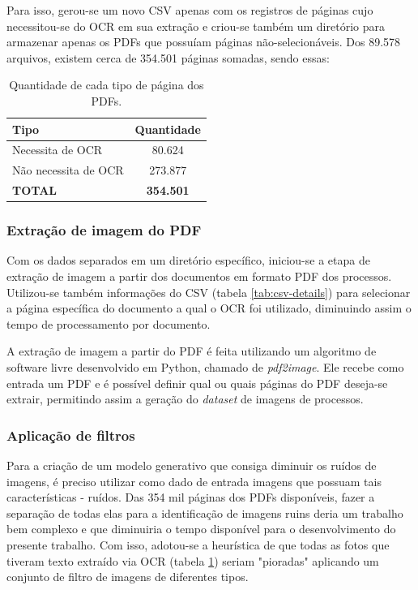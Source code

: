 Para isso, gerou-se um novo CSV apenas com os registros de páginas cujo necessitou-se do OCR em sua extração e criou-se também um diretório para armazenar apenas os PDFs que possuíam páginas não-selecionáveis. Dos 89.578 arquivos, existem cerca de 354.501 páginas somadas, sendo essas:

\begin{table}[H]
  \centering
  \caption{Quantidade de cada tipo de página dos PDFs.}
  \begin{tabular}{|m{10em}|c|}
    \hline
      \textbf{Tipo}  &
      \textbf{Quantidade} \\
    \hline
      Necessita de OCR  &
      80.624 \\
    \hline
      Não necessita de OCR  &
      273.877 \\
    \hline
      \textbf{TOTAL}  &
      \textbf{354.501} \\
    \hline
  \end{tabular}
  \label{tab:csv-diff}
\end{table}

\subsubsection{Extração de imagem do PDF}
Com os dados separados em um diretório específico, iniciou-se a etapa de extração de imagem a partir dos documentos em formato PDF dos processos. Utilizou-se também informações do CSV (tabela \ref{tab:csv-details}) para selecionar a página específica do documento a qual o OCR foi utilizado, diminuindo assim o tempo de processamento por documento.

A extração de imagem a partir do PDF é feita utilizando um algoritmo de software livre desenvolvido em Python, chamado de \textit{pdf2image}. Ele recebe como entrada um PDF e é possível definir qual ou quais páginas do PDF deseja-se extrair, permitindo assim a geração do \textit{dataset} de imagens de processos.

\subsubsection{Aplicação de filtros}
Para a criação de um modelo generativo que consiga diminuir os ruídos de imagens, é preciso utilizar como dado de entrada imagens que possuam tais características - ruídos. Das 354 mil páginas dos PDFs disponíveis, fazer a separação de todas elas para a identificação de imagens ruins deria um trabalho bem complexo e que diminuiria o tempo disponível para o desenvolvimento do presente trabalho. Com isso, adotou-se a heurística de que todas as fotos que tiveram texto extraído via OCR (tabela \ref{tab:csv-diff}) seriam "pioradas" aplicando um conjunto de filtro de imagens de diferentes tipos.

